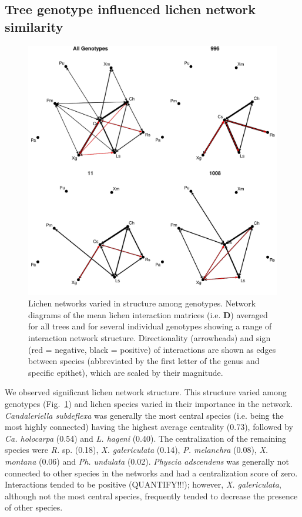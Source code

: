 \documentclass[9pt,twocolumn,twoside,lineno]{pnas-new}
\begin{document}
{\subsection*{Tree genotype influenced lichen network similarity}

\begin{figure}[ht]
\centering
\includegraphics[width=\linewidth]{cn_onc.pdf}
\caption{Lichen networks varied in structure among genotypes. Network
  diagrams of the mean lichen interaction matrices (i.e. $\mathbf{D}$)
  averaged for all trees and for several individual genotypes showing
  a range of interaction network structure. Directionality
  (arrowheads) and sign (red = negative, black = positive) of
  interactions are shown as edges between species (abbreviated by the
  first letter of the genus and specific epithet), which are scaled by
  their magnitude.}
\label{fig:geno_nets}
\end{figure}


We observed significant lichen network structure. This structure
varied among genotypes (Fig.~\ref{fig:geno_nets}) and lichen species
varied in their importance in the network. \textit{Candaleriella
  subdeflexa} was generally the most central species (i.e. being the
most highly connected) having the highest average centrality (0.73),
followed by \textit{Ca. holocarpa} (0.54) and \textit{L. hageni}
(0.40). The centralization of the remaining species were \textit{R.}
sp. (0.18), \textit{X. galericulata} (0.14), \textit{P. melanchra}
(0.08), \textit{X. montana} (0.06) and \textit{Ph. undulata}
(0.02). \textit{Physcia adscendens} was generally not connected to
other species in the networks and had a centralization score of
zero. Interactions tended to be positive (QUANTIFY!!!); however,
\textit{X. galericulata}, although not the most central species,
frequently tended to decrease the presence of other species. 

}
\end{document}
